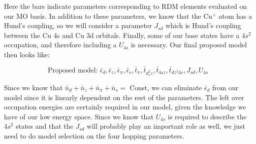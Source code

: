 \documentclass{article}
\begin{document}
Here the bars indicate parameters corresponding to RDM elements evaluated on our MO basis. In addition to these parameters, we know that the Cu$^+$ atom has a Hund's coupling, so we will consider a parameter $J_{sd}$ which is Hund's coupling between the Cu 4s and Cu 3d orbitals. Finally, some of our base states have a $4s^2$ occupation, and therefore including a $U_{4s}$ is necessary. Our final proposed model then looks like: 

$$ \boxed{\text{Proposed model: }\bar{\epsilon}_d, \bar{\epsilon}_z, \bar{\epsilon}_\pi, \bar{\epsilon}_s, \bar{t}_\pi, \bar{t}_{d_z^2 z}, \bar{t}_{4s z}, \bar{t}_{dz^2 4s}, J_{sd}, U_{4s}}$$

Since we know that $\bar{n}_d + \bar{n}_z + \bar{n}_\pi + \bar{n}_s = $ Const, we can eliminate $\bar{\epsilon}_d$ from our model since it is linearly dependent on the rest of the parameters. The left over occupation energies are certainly required in our model, given the knowledge we have of our low energy space. Since we know that $U_{4s}$ is required to describe the $4s^2$ states and that the $J_{sd}$ will probably play an important role as well, we just need to do model selection on the four hopping parameters. 
\end{document}

